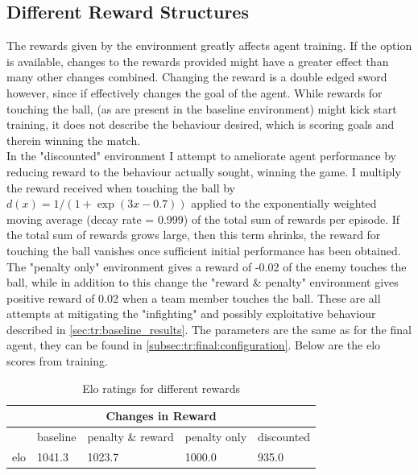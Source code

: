\subsection{Different Reward Structures}\label{subsec:tr:opt:reward}

The rewards given by the environment greatly affects agent training. If the option is available, changes to the rewards provided might have a greater effect than many other changes combined. Changing the reward is a double edged sword however, since if effectively changes the goal of the agent. While rewards for touching the ball, (as are present in the baseline environment) might kick start training, it does not describe the behaviour desired, which is scoring goals and therein winning the match. 
\\In the "discounted" environment I attempt to ameliorate agent performance by reducing reward to the behaviour actually sought, winning the game. I multiply the reward received when touching the ball by $d(x) = 1/(1+\exp(3x-0.7))$ applied to the exponentially weighted moving average (decay rate = 0.999) of the total sum of rewards per episode. If the total sum of rewards grows large, then this term shrinks, the reward for touching the ball vanishes once sufficient initial performance has been obtained.
\\ The "penalty only" environment gives a reward of -0.02 of the enemy touches the ball, while in addition to this change the "reward \& penalty" environment gives positive reward of 0.02 when a team member touches the ball. These are all attempts at mitigating the "infighting" and possibly exploitative behaviour described in \ref{sec:tr:baseline_results}. The parameters are the same as for the final agent, they can be found in \ref{subsec:tr:final:configuration}. Below are the elo scores from training.

\begin{table}[H]
    \begin{center}
    \begin{tabular}{ |l|l|l|l|l| }
        \hline
        \multicolumn{5}{|c|}{Changes in Reward}\\
        \hline
        \hline
         & baseline & penalty \& reward & penalty only & discounted \\
        \hline
        elo & 1041.3 & 1023.7 & 1000.0 & 935.0 \\ 
        \hline
    \end{tabular}
    \end{center}
    \caption{Elo ratings for different rewards}
    \label{tab:my_label}
\end{table}

